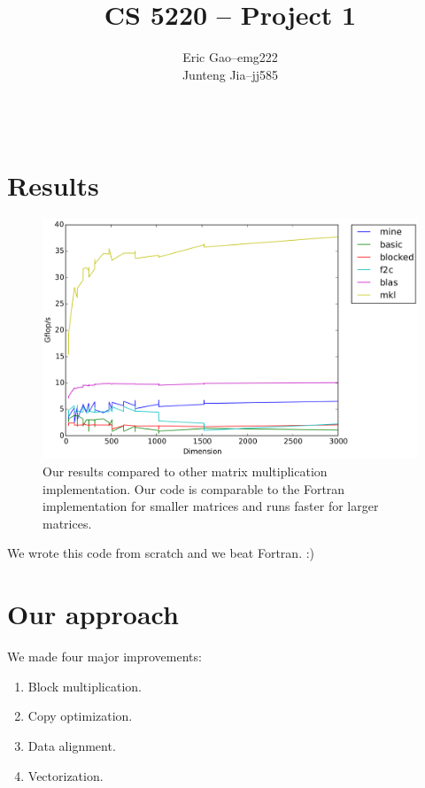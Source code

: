 \documentclass[11pt]{article}
\title{CS 5220 -- Project 1} %
\author{
  \begin{tabular}{l c l}
    Eric Gao & -- & emg222\\
    Junteng Jia & -- & jj585
  \end{tabular}\\
  \rule{\linewidth}{0.4pt}
}
\date{}
\begin{document}
    \thispagestyle{empty}
    \maketitle

    \section*{Results}
        \begin{figure}[H]
            \centering
            \includegraphics[width=6.5in]{timingvector32.png}
            \caption{Our results compared to other matrix multiplication implementation. Our code is comparable to the Fortran implementation for smaller matrices and runs faster for larger matrices.}
        \end{figure}

        We wrote this code from scratch and we beat Fortran. :)

    \pagebreak
    \section*{Our approach}
        We made four major improvements:
        \begin{enumerate}
            \item Block multiplication.
            \item Copy optimization.
            \item Data alignment.
            \item Vectorization.
        \end{enumerate}
\end{document}
